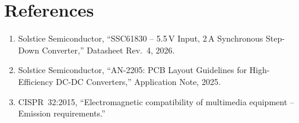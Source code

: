 \documentclass[11pt,a4paper]{article}
\begin{document}
\section*{References}
\begin{enumerate}[leftmargin=1.6em,itemsep=2pt]
\item\label{ref:datasheet} Solstice Semiconductor, ``SSC61830 -- 5.5\,V
      Input, 2\,A Synchronous Step-Down Converter,'' Datasheet Rev.~4, 2026.
\item Solstice Semiconductor, ``AN-2205: PCB Layout Guidelines for
      High-Efficiency DC-DC Converters,'' Application Note, 2025.
\item\label{ref:cispr} CISPR~32:2015, ``Electromagnetic compatibility of
      multimedia equipment -- Emission requirements.''
\end{enumerate}
\end{document}
